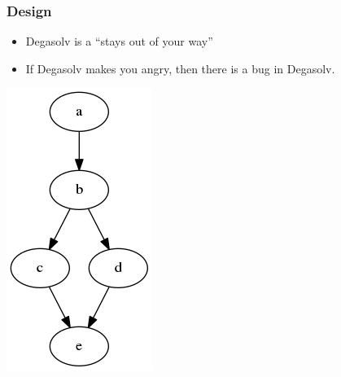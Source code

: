 \documentclass{beamer}
\begin{document}
\begin{frame}
  \frametitle{Design}
  \begin{itemize}
  \item Degasolv is a ``stays out of your way''
  \item If Degasolv makes you angry, then there is a bug in Degasolv.
  \end{itemize}
  \centerline{\includegraphics[scale=0.5]{diamonddep.png}}
\end{frame}
\end{document}
